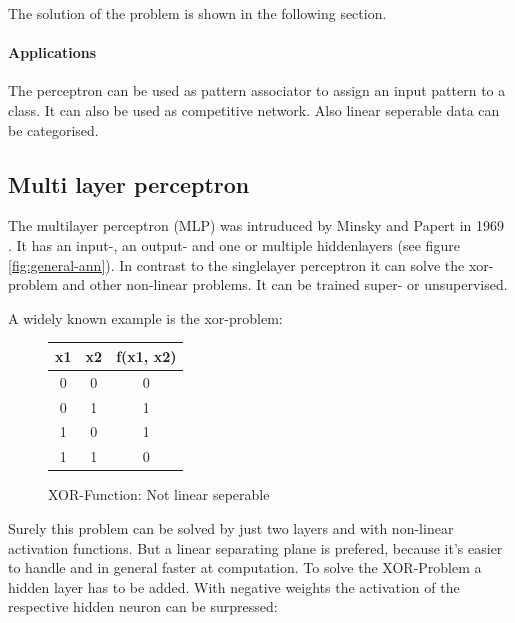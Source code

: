 \documentclass[10pt,a4paper,DIV=11]{scrreprt}
\begin{document}
The solution of the problem is shown in the following section.

\paragraph*{Applications}
The perceptron can be used as pattern associator to assign an input pattern to a class. It can also be used as competitive network. Also linear seperable data can be categorised.

\subsection{Multi layer perceptron} \label{sec:mlp}
The multilayer perceptron (MLP) was intruduced by Minsky and Papert in 1969 \cite{min}. It has an input-, an output- and
one or multiple hiddenlayers (see figure \ref{fig:general-ann}). In contrast to the singlelayer perceptron it can solve the xor-problem and other non-linear problems. It can be trained super- or unsupervised.

A widely known example is the xor-problem:

\begin{figure}[H]
	\centering
	\begin{tabular}{|c|c|c|}
		\hline
		x1 & x2 & f(x1, x2)\\
		\hline
		0 & 0 & 0 \\
		\hline
		0 & 1 & 1 \\
		\hline
		1 & 0 & 1 \\
		\hline
		1 & 1 & 0 \\
		\hline
	\end{tabular}
	\caption{XOR-Function: Not linear seperable}
	\label{fig:nlinsep}

\end{figure}

Surely this problem can be solved by just two layers and with non-linear activation functions. But a linear separating plane is prefered, because it's easier to handle and in general faster at computation.
To solve the XOR-Problem a hidden layer has to be added. With negative weights the activation of the respective hidden neuron can be surpressed:
\end{document}
